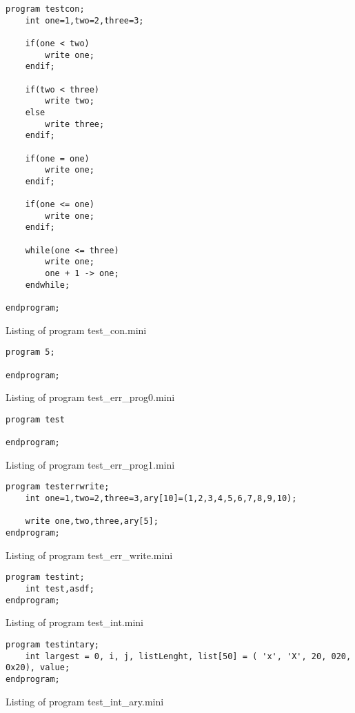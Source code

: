 \begin{program}
\begin{verbatim}
program testcon;
	int one=1,two=2,three=3;

	if(one < two)
		write one;
	endif;

	if(two < three)
		write two;
	else
		write three;
	endif;

	if(one = one)
		write one;
	endif;

	if(one <= one)
		write one;
	endif;

	while(one <= three)
		write one;
		one + 1 -> one;
	endwhile;

endprogram;\end{verbatim}
\caption{Listing of program test\_con.mini}
\end{program}

\begin{program}
\begin{verbatim}
program 5;

endprogram;
\end{verbatim}
\caption{Listing of program test\_err\_prog0.mini}
\end{program}

\begin{program}
\begin{verbatim}
program test

endprogram;
\end{verbatim}
\caption{Listing of program test\_err\_prog1.mini}
\end{program}

\begin{program}
\begin{verbatim}
program testerrwrite;
	int one=1,two=2,three=3,ary[10]=(1,2,3,4,5,6,7,8,9,10);

	write one,two,three,ary[5];
endprogram;\end{verbatim}
\caption{Listing of program test\_err\_write.mini}
\end{program}

\begin{program}
\begin{verbatim}
program testint;
	int test,asdf;
endprogram;
\end{verbatim}
\caption{Listing of program test\_int.mini}
\end{program}

\begin{program}
\begin{verbatim}
program testintary;
	int largest = 0, i, j, listLenght, list[50] = ( 'x', 'X', 20, 020, 0x20), value;
endprogram;
\end{verbatim}
\caption{Listing of program test\_int\_ary.mini}
\end{program}

